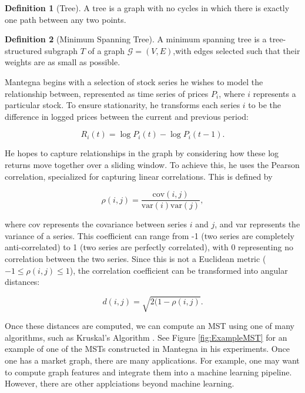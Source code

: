 \documentclass[12pt]{article}
\theoremstyle{definition}
\newtheorem{definition}{Definition}[section]
\begin{document}
\begin{definition}[Tree]
A tree is a graph with no cycles in which there is exactly one path between any two points.
\end{definition}

\begin{definition}[Minimum Spanning Tree]
A minimum spanning tree is a tree-structured subgraph $T$ of a graph $\mathcal{G} = (V, E)$,with edges selected such that their weights are as small as possible.
\end{definition}


Mantegna begins with a selection of stock series he wishes to model the relationship between, represented as time series of prices $P_i$, where $i$ represents a particular stock. To ensure stationarity, he transforms each series $i$ to be the difference in logged prices between the current and previous period:

\[
R_i(t) = \log P_i(t) - \log P_i(t-1).
\]

He hopes to capture relationships in the graph by considering how these log returns move together over a sliding window. To achieve this, he uses the Pearson correlation, specialized for capturing linear correlations. This is defined by

\[
\rho(i,j) = \frac{\text{cov}(i, j)}{\text{var}(i) \text{var}(j)},
\]

where cov represents the covariance between series $i$ and $j$, and var represents the variance of a series. This coefficient can range from -1 (two series are completely anti-correlated) to 1 (two series are perfectly correlated), with 0 representing no correlation between the two series. Since this is not a Euclidean metric ($-1 \leq \rho(i,j) \leq 1$), the correlation coefficient can be transformed into angular distances:

\[
d(i,j) = \sqrt{2(1 - \rho(i,j)}.
\]

Once these distances are computed, we can compute an MST using one of many algorithms, such as Kruskal's Algorithm \cite{kruskalsAlgorithm} \cite{networkSurveyFinance}. See Figure \ref{fig:ExampleMST} for an example of one of the MSTs constructed in Mantegna in his experiments. Once one has a market graph, there are many applications. For example, one may want to compute graph features and integrate them into a machine learning pipeline. However, there are other applciations beyond machine learning.
\end{document}
